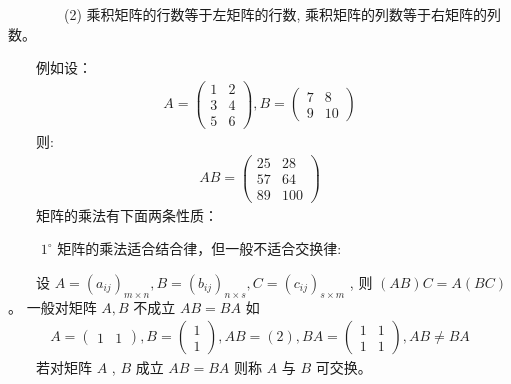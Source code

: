 \documentclass[a4paper,11pt,english]{sphinxmanual}
\begin{document}
\sphinxAtStartPar
​  ​  (2) 乘积矩阵的行数等于左矩阵的行数, 乘积矩阵的列数等于右矩阵的列数。

\sphinxAtStartPar
​  例如设：
\begin{equation*}
\begin{split}A=\left(\begin{array}{ll} 1 & 2 \\ 3 & 4 \\ 5 & 6 \end{array}\right), B=\left(\begin{array}{cc} 7 & 8 \\ 9 & 10 \end{array}\right)\end{split}
\end{equation*}
\sphinxAtStartPar
​  则:
\begin{equation*}
\begin{split}A B=\left(\begin{array}{cc}25 & 28 \\57 & 64 \\89 & 100\end{array}\right)\end{split}
\end{equation*}
\sphinxAtStartPar
​  矩阵的乘法有下面两条性质：

\sphinxAtStartPar
   \(1^{\circ}\)  矩阵的乘法适合结合律，但一般不适合交换律:

\sphinxAtStartPar
  设  \(A=\left(a_{ij}\right)_{m \times n}, B=\left(b_{i j}\right)_{n \times s}, C=\left(c_{i j}\right)_{s \times m}\) , 则  \((A B) C=A(B C)\) 。 一般对矩阵  \(A, B\)  不成立  \(A B=B A\)  如
\begin{equation*}
\begin{split}A=\left(\begin{array}{ll} 1 & 1 \end{array}\right), B=\left(\begin{array}{l} 1 \\ 1 \end{array}\right), A B=(2), B A=\left(\begin{array}{ll} 1 & 1 \\ 1 & 1 \end{array}\right), A B \neq B A\end{split}
\end{equation*}
\sphinxAtStartPar
​  若对矩阵  \(A\) , \(B\)  成立  \(A B=B A\)  则称  \(A\)  与  \(B\)  可交换。
\end{document}
